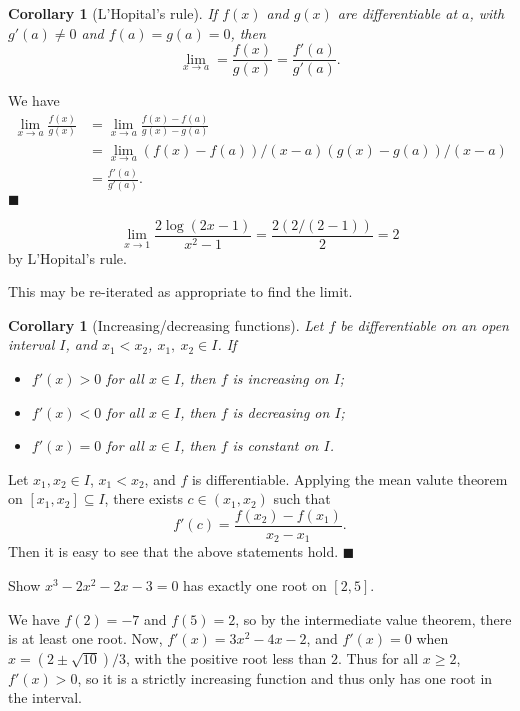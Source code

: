\documentclass[letter-paper]{tufte-book}
\newtheorem{corollary}[theorem]{\color{pastel-blue}Corollary}
\newenvironment{proof}[1][Proof]{\begin{trivlist}
\item[\hskip \labelsep {\bfseries #1}]}{\end{trivlist}}
\newenvironment{example}[1][Example]{\begin{trivlist}
\item[\hskip \labelsep {\bfseries #1}]}{\end{trivlist}}
\newcommand{\qed}{\hfill$\blacksquare$}
\begin{document}
\begin{corollary}[L'Hopital's rule]
  If $f(x)$ and $g(x)$ are differentiable at $a$, with $g'(a)\neq0$ and
  $f(a)=g(a)=0$, then
  \begin{equation*}
    \lim_{x\to a}=\frac{f(x)}{g(x)}=\frac{f'(a)}{g'(a)}.
  \end{equation*}
\end{corollary}
\begin{proof}
  We have
  \begin{align*}
    \lim_{x\to a}\frac{f(x)}{g(x)} &= \lim_{x\to a}\frac{f(x)-f(a)}{g(x)-g(a)} \\
      &= \lim_{x\to a}{(f(x)-f(a))/(x-a)}{(g(x)-g(a))/(x-a)} \\
      &= \frac{f'(a)}{g'(a)}.
  \end{align*}
  \qed
\end{proof}
\begin{example}
  \begin{equation*}
    \lim_{x\to 1}\frac{2\log(2x-1)}{x^2-1}=\frac{2(2/(2-1))}{2}=2
  \end{equation*}
  by L'Hopital's rule.
\end{example}
This may be re-iterated as appropriate to find the limit.

\begin{corollary}[Increasing/decreasing functions]
  Let $f$ be differentiable on an open interval $I$, and $x_1 < x_2$, $x_1,\
  x_2\in I$. If
  \begin{itemize}
    \item $f'(x)>0$ for all $x\in I$, then $f$ is increasing on $I$;
    \item $f'(x)<0$ for all $x\in I$, then $f$ is decreasing on $I$;
    \item $f'(x)=0$ for all $x\in I$, then $f$ is constant on $I$.
  \end{itemize}
\end{corollary}
\begin{proof}
  Let $x_1, x_2\in I$, $x_1 < x_2$, and $f$ is differentiable. Applying the mean
  valute theorem on $[x_1, x_2]\subseteq I$, there exists $c\in(x_1, x_2)$ such
  that
  \begin{equation*}
    f'(c)=\frac{f(x_2)-f(x_1)}{x_2 - x_1}.
  \end{equation*}
  Then it is easy to see that the above statements hold. \qed
\end{proof}
\begin{example}
  Show $x^3 - 2x^2 - 2x - 3 = 0$ has exactly one root on $[2,5]$.
  
  We have $f(2)=-7$ and $f(5)=2$, so by the intermediate value theorem, there is
  at least one root. Now, $f'(x)=3x^2 - 4x - 2$, and $f'(x)=0$ when
  $x=(2\pm\sqrt{10})/3$, with the positive root less than $2$. Thus for all
  $x\geq 2$, $f'(x)>0$, so it is a strictly increasing function and thus only
  has one root in the interval.
\end{example}
\end{document}
